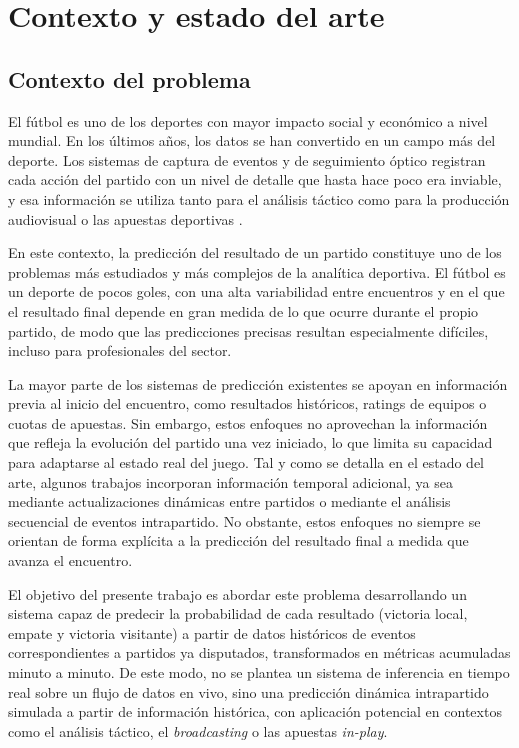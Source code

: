 \chapter{Contexto y estado del arte}
\section{Contexto del problema}
El fútbol es uno de los deportes con mayor impacto social y económico a nivel mundial. En los últimos años, los datos se han convertido en un campo más del deporte. Los sistemas de captura de eventos y de seguimiento óptico registran cada acción del partido con un nivel de detalle que hasta hace poco era inviable, y esa información se utiliza tanto para el análisis táctico como para la producción audiovisual o las apuestas deportivas \citep{goes2021bigdata, rein2016bigdata}.

En este contexto, la predicción del resultado de un partido constituye uno de los problemas más estudiados y más complejos de la analítica deportiva. El fútbol es un deporte de pocos goles, con una alta variabilidad entre encuentros y en el que el resultado final depende en gran medida de lo que ocurre durante el propio partido, de modo que las predicciones precisas resultan especialmente difíciles, incluso para profesionales del sector.

La mayor parte de los sistemas de predicción existentes se apoyan en información previa al inicio del encuentro, como resultados históricos, ratings de equipos o cuotas de apuestas. Sin embargo, estos enfoques no aprovechan la información que refleja la evolución del partido una vez iniciado, lo que limita su capacidad para adaptarse al estado real del juego. Tal y como se detalla en el estado del arte, algunos trabajos incorporan información temporal adicional, ya sea mediante actualizaciones dinámicas entre partidos o mediante el análisis secuencial de eventos intrapartido. No obstante, estos enfoques no siempre se orientan de forma explícita a la predicción del resultado final a medida que avanza el encuentro.

El objetivo del presente trabajo es abordar este problema desarrollando un sistema capaz de predecir la probabilidad de cada resultado (victoria local, empate y victoria visitante) a partir de datos históricos de eventos correspondientes a partidos ya disputados, transformados en métricas acumuladas minuto a minuto. De este modo, no se plantea un sistema de inferencia en tiempo real sobre un flujo de datos en vivo, sino una predicción dinámica intrapartido simulada a partir de información histórica, con aplicación potencial en contextos como el análisis táctico, el \textit{broadcasting} o las apuestas \textit{in-play}.

